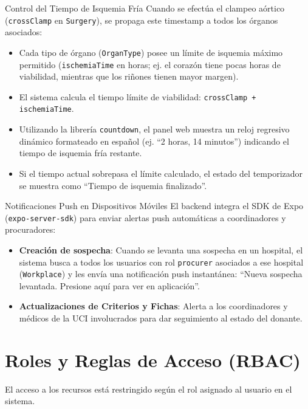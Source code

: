 \documentclass[11pt, a4paper]{article}
\begin{document}
\newpage

\begin{conceptobox}{Control del Tiempo de Isquemia Fría}
Cuando se efectúa el clampeo aórtico (\texttt{crossClamp} en \texttt{Surgery}), se propaga este timestamp a todos los órganos asociados:
\begin{itemize}
    \item Cada tipo de órgano (\texttt{OrganType}) posee un límite de isquemia máximo permitido (\texttt{ischemiaTime} en horas; ej. el corazón tiene pocas horas de viabilidad, mientras que los riñones tienen mayor margen).
    \item El sistema calcula el tiempo límite de viabilidad: \texttt{crossClamp + ischemiaTime}.
    \item Utilizando la librería \texttt{countdown}, el panel web muestra un reloj regresivo dinámico formateado en español (ej. ``2 horas, 14 minutos'') indicando el tiempo de isquemia fría restante.
    \item Si el tiempo actual sobrepasa el límite calculado, el estado del temporizador se muestra como ``Tiempo de isquemia finalizado''.
\end{itemize}
\end{conceptobox}

\vspace{0.3cm}

\begin{conceptobox}{Notificaciones Push en Dispositivos Móviles}
El backend integra el SDK de Expo (\texttt{expo-server-sdk}) para enviar alertas push automáticas a coordinadores y procuradores:
\begin{itemize}
    \item \textbf{Creación de sospecha}: Cuando se levanta una sospecha en un hospital, el sistema busca a todos los usuarios con rol \texttt{procurer} asociados a ese hospital (\texttt{Workplace}) y les envía una notificación push instantánea: ``Nueva sospecha levantada. Presione aquí para ver en aplicación''.
    \item \textbf{Actualizaciones de Criterios y Fichas}: Alerta a los coordinadores y médicos de la UCI involucrados para dar seguimiento al estado del donante.
\end{itemize}
\end{conceptobox}

\newpage

\section{Roles y Reglas de Acceso (RBAC)}
El acceso a los recursos está restringido según el rol asignado al usuario en el sistema.
\end{document}
